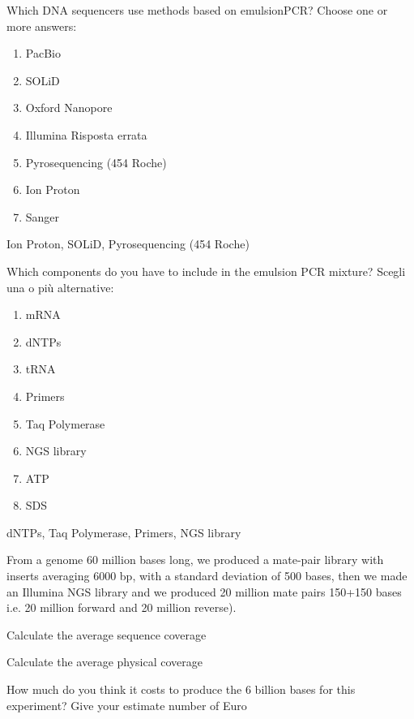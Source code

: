 \begin{Exercise} [
  label={ex28},
  origin={G. Valle}
 ]

\Question Which DNA sequencers use methods based on emulsionPCR?
Choose one or more answers:
\begin{enumerate}
\item PacBio
\item SOLiD
\item Oxford Nanopore
\item Illumina Risposta errata
\item Pyrosequencing (454 Roche)
\item Ion Proton
\item Sanger
\end{enumerate}

\end{Exercise}

\begin{Answer} [
  ref={ex28},
  number={1}
 ]

\Question Ion Proton, SOLiD, Pyrosequencing (454 Roche)

\end{Answer}

\begin{Exercise} [
  label={ex29},
  origin={G. Valle}
 ]

\Question Which components do you have to include in the emulsion PCR mixture?
Scegli una o più alternative:
\begin{enumerate}
\item mRNA
\item dNTPs
\item tRNA
\item Primers
\item Taq Polymerase
\item NGS library
\item ATP
\item SDS
\end{enumerate}

\end{Exercise}

\begin{Answer} [
  ref={ex29},
  number={1}
 ]

\Question dNTPs, Taq Polymerase, Primers, NGS library

\end{Answer}

\begin{Exercise} [
  label={ex30},
  origin={G. Valle}
 ]

From a genome 60 million bases long, we produced a mate-pair library with
inserts averaging 6000 bp, with a standard deviation of 500 bases, then we made
an Illumina NGS library and we produced 20 million mate pairs 150+150 bases 
i.e. 20 million forward and 20 million reverse).

\Question Calculate the average sequence coverage

\Question Calculate the average physical coverage

\Question How much do you think it costs to produce the 6 billion bases for
this experiment?  Give your estimate number of Euro

\end{Exercise}

